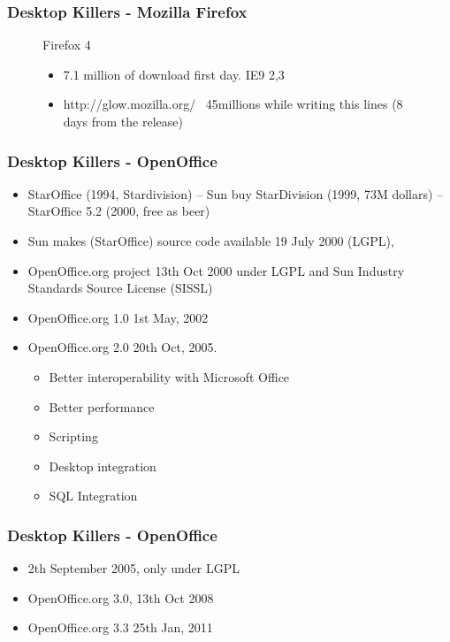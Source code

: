 \documentclass{beamer}
\begin{document}
\begin{frame}
\frametitle{Desktop Killers - Mozilla Firefox}
\begin{figure}
\item Firefox 4
	\begin{itemize}
	\item 7.1 million of download first day. IE9 2,3
	\item http://glow.mozilla.org/  ~45millions while writing this lines (8 days from the release)
	\end{itemize} 
\end{figure}
\end{frame}

\begin{frame}
\frametitle{Desktop Killers - OpenOffice}

\begin{itemize}
\item StarOffice (1994, Stardivision) -- Sun buy StarDivision (1999, 73M dollars) -- StarOffice 5.2 (2000, free as beer) 
\item Sun makes (StarOffice) source code available 19 July 2000 (LGPL),
\item OpenOffice.org project 13th Oct 2000 under LGPL and Sun Industry Standards Source License (SISSL)
\item OpenOffice.org 1.0 1st May, 2002
\item OpenOffice.org 2.0 20th Oct, 2005. 
	\begin{itemize}
	\item Better interoperability with Microsoft Office
	\item Better performance
	\item Scripting
	\item Desktop integration
	\item SQL Integration
	\end{itemize}
\end{itemize}

\end{frame}


\begin{frame}
\frametitle{Desktop Killers - OpenOffice}

\begin{itemize}
\item 2th September 2005, only under LGPL
\item OpenOffice.org 3.0, 13th Oct 2008
\item OpenOffice.org 3.3 25th Jan, 2011
\end{itemize}

\end{frame}
\end{document}
